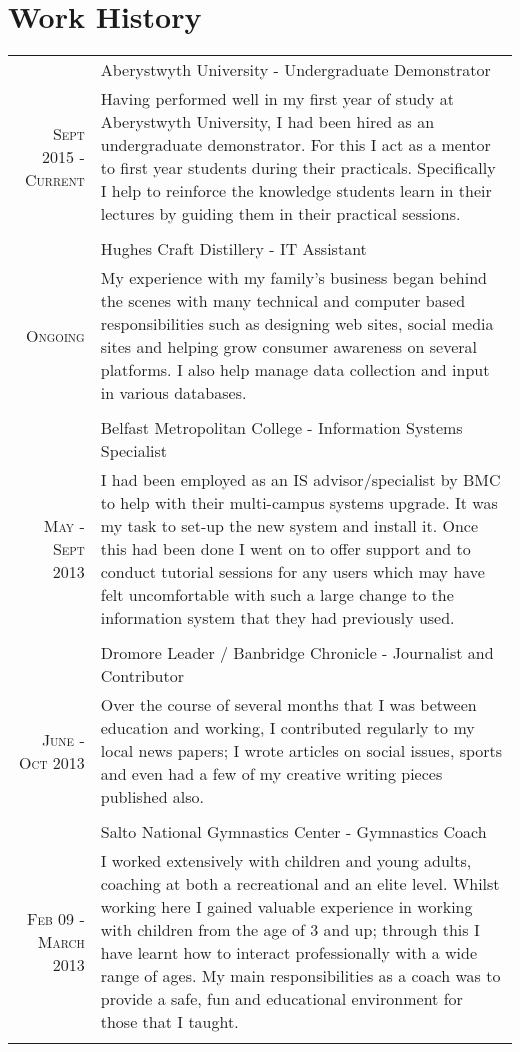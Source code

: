\documentclass[a4paper,10pt]{article}
\begin{document}
\section{Work History}
\begin{longtable}{r|p{11cm}}

 &Aberystwyth University - Undergraduate Demonstrator \\\textsc{Sept 2015 - Current}&\footnotesize{Having performed well in my first year of study at Aberystwyth University, I had been hired as an undergraduate demonstrator. For this I act as a mentor to first year students during their practicals. Specifically I help to reinforce the knowledge students learn in their lectures by guiding them in their practical sessions.}\\\multicolumn{2}{c}{} \\
 &Hughes Craft Distillery - IT Assistant \\\textsc{Ongoing}&\footnotesize{ My experience with my family's business began behind the scenes with many technical and computer based responsibilities such as designing web sites, social media sites and helping grow consumer awareness on several platforms. I also help manage data collection and input in various databases.
}\\\multicolumn{2}{c}{} \\

 &Belfast Metropolitan College - Information Systems Specialist \\\textsc{May - Sept 2013}&\footnotesize{I had been employed as an IS advisor/specialist by BMC to help with their multi-campus systems upgrade. It was my task to set-up the new system and install it. Once this had been done I went on to offer support and to conduct 
tutorial sessions for any users which may have felt uncomfortable with such a large change to the information 
system that they had previously used.}\\\multicolumn{2}{c}{} \\
 &Dromore Leader / Banbridge Chronicle - Journalist and Contributor \\\textsc{June - Oct 2013}&\footnotesize{Over the course of several months that I was between education and working, I contributed regularly to my local news papers; I wrote articles on social issues, sports and even had a few of my creative writing pieces published also.}\\\multicolumn{2}{c}{} \\

 &Salto National Gymnastics Center - Gymnastics Coach \\\textsc{Feb 09 - March 2013}&\footnotesize{I worked extensively with children and young adults, coaching at both a recreational and an elite level. Whilst working here I gained valuable experience in working with children from the age of 3 and up; through this I have learnt how to interact professionally with a wide range of ages. My main responsibilities as a coach was to provide a safe, fun and educational environment for those that I taught.}\\\multicolumn{2}{c}{} \\
\end{longtable}
\end{document}
